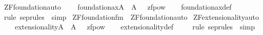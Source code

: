 \begin{isabellebody}
\isanewline
{}\isamarkupfalse%
\ ZF{\isacharunderscore}{\kern0pt}foundation{\isacharunderscore}{\kern0pt}auto{\isacharcolon}{\kern0pt}\isanewline
\ \ \ \ {\isachardoublequoteopen}foundation{\isacharunderscore}{\kern0pt}ax{\isacharparenleft}{\kern0pt}{\isacharhash}{\kern0pt}{\isacharhash}{\kern0pt}A{\isacharparenright}{\kern0pt}\ {\isasymlongleftrightarrow}\ {\isacharparenleft}{\kern0pt}A{\isacharcomma}{\kern0pt}\ {\isacharbrackleft}{\kern0pt}{\isacharbrackright}{\kern0pt}\ {\isasymTurnstile}\ {\isacharquery}{\kern0pt}zfpow{\isacharparenright}{\kern0pt}{\isachardoublequoteclose}\isanewline
%
\isadelimproof
\ \ %
\endisadelimproof
%
\isatagproof
{}\isamarkupfalse%
\ foundation{\isacharunderscore}{\kern0pt}ax{\isacharunderscore}{\kern0pt}def\ \isanewline
\ \ \isamarkupfalse%
\ {\isacharparenleft}{\kern0pt}{\isacharparenleft}{\kern0pt}rule\ sep{\isacharunderscore}{\kern0pt}rules\ {\isacharbar}{\kern0pt}\ simp{\isacharparenright}{\kern0pt}{\isacharplus}{\kern0pt}{\isacharparenright}{\kern0pt}%
\endisatagproof
{\isafoldproof}%
%
\isadelimproof
\isanewline
%
\endisadelimproof
%
\isadelimML
\isanewline
%
\endisadelimML
%
\isatagML
{}\isamarkupfalse%
\ {\isachardoublequoteopen}ZF{\isacharunderscore}{\kern0pt}foundation{\isacharunderscore}{\kern0pt}fm{\isachardoublequoteclose}\ \ ZF{\isacharunderscore}{\kern0pt}foundation{\isacharunderscore}{\kern0pt}auto%
\endisatagML
{\isafoldML}%
%
\isadelimML
\isanewline
%
\endisadelimML
\isanewline
{}\isamarkupfalse%
\ ZF{\isacharunderscore}{\kern0pt}extensionality{\isacharunderscore}{\kern0pt}auto{\isacharcolon}{\kern0pt}\isanewline
\ \ \ \ {\isachardoublequoteopen}extensionality{\isacharparenleft}{\kern0pt}{\isacharhash}{\kern0pt}{\isacharhash}{\kern0pt}A{\isacharparenright}{\kern0pt}\ {\isasymlongleftrightarrow}\ {\isacharparenleft}{\kern0pt}A{\isacharcomma}{\kern0pt}\ {\isacharbrackleft}{\kern0pt}{\isacharbrackright}{\kern0pt}\ {\isasymTurnstile}\ {\isacharquery}{\kern0pt}zfpow{\isacharparenright}{\kern0pt}{\isachardoublequoteclose}\isanewline
%
\isadelimproof
\ \ %
\endisadelimproof
%
\isatagproof
{}\isamarkupfalse%
\ extensionality{\isacharunderscore}{\kern0pt}def\ \isanewline
\ \ \isamarkupfalse%
\ {\isacharparenleft}{\kern0pt}{\isacharparenleft}{\kern0pt}rule\ sep{\isacharunderscore}{\kern0pt}rules\ {\isacharbar}{\kern0pt}\ simp{\isacharparenright}{\kern0pt}{\isacharplus}{\kern0pt}{\isacharparenright}{\kern0pt}%

\end{isabellebody}
